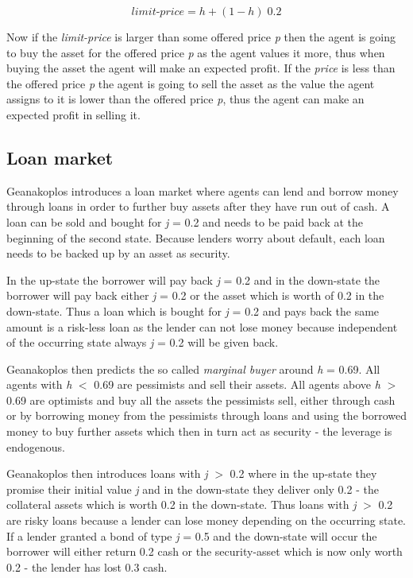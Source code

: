 \documentclass[../Bachelorarbeit.tex]{subfiles}
\begin{document}
\begin{equation}
\textit{limit-price} = h + (1 - h) \; 0.2
\end{equation}

Now if the \textit{limit-price} is larger than some offered price \textit{p} then the agent is going to buy the asset for the offered price \textit{p} as the agent values it more, thus when buying the asset the agent will make an expected profit. If the \textit{price} is less than the offered price \textit{p} the agent is going to sell the asset as the value the agent assigns to it is lower than the offered price \textit{p}, thus the agent can make an expected profit in selling it.

\subsection{Loan market}
Geanakoplos introduces a loan market where agents can lend and borrow money through loans in order to further buy assets after they have run out of cash. A loan can be sold and bought for \textit{j} = 0.2 and needs to be paid back at the beginning of the second state. Because lenders worry about default, each loan needs to be backed up by an asset as security.

\medskip

In the up-state the borrower will pay back \textit{j} = 0.2 and in the down-state the borrower will pay back either \textit{j} = 0.2 or the asset which is worth of 0.2 in the down-state. Thus a loan which is bought for \textit{j} = 0.2 and pays back the same amount is a risk-less loan as the lender can not lose money because independent of the occurring state always \textit{j} = 0.2 will be given back.

\medskip

Geanakoplos then predicts the so called \textit{marginal buyer} around \textit{h} = 0.69. All agents with \textit{h} $<$ 0.69 are pessimists and sell their assets. All agents above \textit{h} $>$ 0.69 are optimists and buy all the assets the pessimists sell, either through cash or by borrowing money from the pessimists through loans and using the borrowed money to buy further assets which then in turn act as security - the leverage is endogenous.

\medskip

Geanakoplos then introduces loans with \textit{j} $>$ 0.2 where in the up-state they promise their initial value \textit{j} and in the down-state they deliver only 0.2 - the collateral assets which is worth 0.2 in the down-state. Thus loans with \textit{j} $>$ 0.2 are risky loans because a lender can lose money depending on the occurring state. If a lender granted a bond of type \textit{j} = 0.5 and the down-state will occur the borrower will either return 0.2 cash or the security-asset which is now only worth 0.2 - the lender has lost 0.3 cash.
\end{document}
